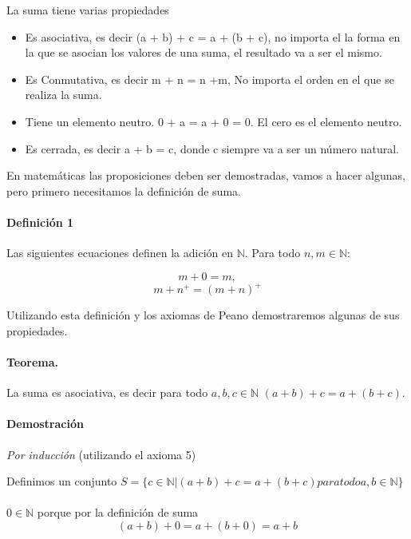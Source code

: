 \documentclass{article}
\begin{document}
La suma tiene varias propiedades

\begin{itemize}
    \item Es asociativa, es decir (a + b) + c = a + (b + c), no importa el la forma en la que se asocian los valores de una suma, el resultado va a ser el mismo.
    \item Es Conmutativa, es decir m + n = n +m, No importa el orden en el que se realiza la suma.
    \item Tiene un elemento neutro.  0 + a = a + 0 = 0. El cero es el elemento neutro.
    \item Es cerrada, es decir a + b = c, donde c siempre va a ser un número natural.
\end{itemize}

En matemáticas las proposiciones deben ser demostradas, vamos a hacer algunas, pero primero necesitamos la definición de suma.

\paragraph{Definición 1}\cite{tnumprincip_2004}\label{def:sum} Las siguientes ecuaciones definen la adición en $\mathbb{N}$. Para todo $n,m \in \mathbb{N}$:

$$m + 0 = m,$$
$$m + n^+ = (m + n)^+$$

Utilizando esta definición y los axiomas de Peano demostraremos algunas de sus propiedades.

\paragraph{Teorema.} La suma es asociativa, es decir para todo $a,b,c \in \mathbb{N}$ $(a + b) + c = a + (b + c)$.

\paragraph{Demostración} \textit{Por inducción} (utilizando el axioma 5)

Definimos un conjunto $S = \{c \in \mathbb{N} | (a + b) + c = a + (b + c) para todo a,b \in \mathbb{N}\}$

\paragraph{} $0 \in \mathbb{N}$ porque por la definición de suma
$$ (a + b) + 0 = a + (b + 0) = a + b$$
\end{document}
